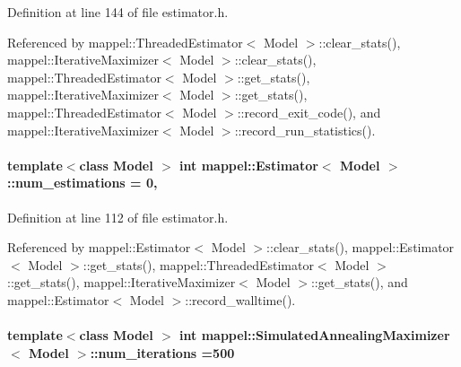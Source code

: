 Definition at line 144 of file estimator.\+h.



Referenced by mappel\+::\+Threaded\+Estimator$<$ Model $>$\+::clear\+\_\+stats(), mappel\+::\+Iterative\+Maximizer$<$ Model $>$\+::clear\+\_\+stats(), mappel\+::\+Threaded\+Estimator$<$ Model $>$\+::get\+\_\+stats(), mappel\+::\+Iterative\+Maximizer$<$ Model $>$\+::get\+\_\+stats(), mappel\+::\+Threaded\+Estimator$<$ Model $>$\+::record\+\_\+exit\+\_\+code(), and mappel\+::\+Iterative\+Maximizer$<$ Model $>$\+::record\+\_\+run\+\_\+statistics().

\paragraph[{\texorpdfstring{num\+\_\+estimations}{num_estimations}}]{\setlength{\rightskip}{0pt plus 5cm}template$<$class Model $>$ int {\bf mappel\+::\+Estimator}$<$ Model $>$\+::num\+\_\+estimations = 0\hspace{0.3cm}{\ttfamily [protected]}, {\ttfamily [inherited]}}\hypertarget{classmappel_1_1Estimator_ab15b88435d6c50a68fac84465d950b12}{}\label{classmappel_1_1Estimator_ab15b88435d6c50a68fac84465d950b12}


Definition at line 112 of file estimator.\+h.



Referenced by mappel\+::\+Estimator$<$ Model $>$\+::clear\+\_\+stats(), mappel\+::\+Estimator$<$ Model $>$\+::get\+\_\+stats(), mappel\+::\+Threaded\+Estimator$<$ Model $>$\+::get\+\_\+stats(), mappel\+::\+Iterative\+Maximizer$<$ Model $>$\+::get\+\_\+stats(), and mappel\+::\+Estimator$<$ Model $>$\+::record\+\_\+walltime().

\paragraph[{\texorpdfstring{num\+\_\+iterations}{num_iterations}}]{\setlength{\rightskip}{0pt plus 5cm}template$<$class Model $>$ int {\bf mappel\+::\+Simulated\+Annealing\+Maximizer}$<$ Model $>$\+::num\+\_\+iterations =500}\hypertarget{classmappel_1_1SimulatedAnnealingMaximizer_aa116767bae33acaa107913067013e26d}{}\label{classmappel_1_1SimulatedAnnealingMaximizer_aa116767bae33acaa107913067013e26d}


